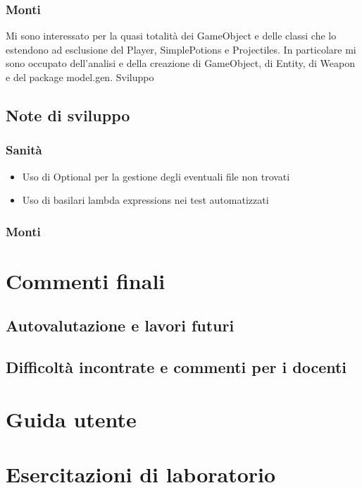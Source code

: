\documentclass[a4paper,12pt]{report}
\begin{document}
    \subsection{Monti}
    \par Mi sono interessato per la quasi totalità dei GameObject e delle classi che lo estendono ad esclusione del Player, SimplePotions e Projectiles.
    In particolare mi sono occupato dell'analisi e della creazione di GameObject, di Entity, di Weapon e del package model.gen.
    Sviluppo
    
    \section{Note di sviluppo}
    \subsection{Sanità}
    \begin{itemize}
            \item Uso di Optional per la gestione degli eventuali file non trovati
            \item Uso di basilari lambda expressions nei test automatizzati
    \end{itemize}
    \subsection{Monti}
    \chapter{Commenti finali}
    \section{Autovalutazione e lavori futuri}
    \section{Difficoltà incontrate e commenti per i docenti}
    \appendix
    \chapter{Guida utente}
    \chapter{Esercitazioni di laboratorio}
    \printbibliography[heading=bibintoc]
\end{document}
